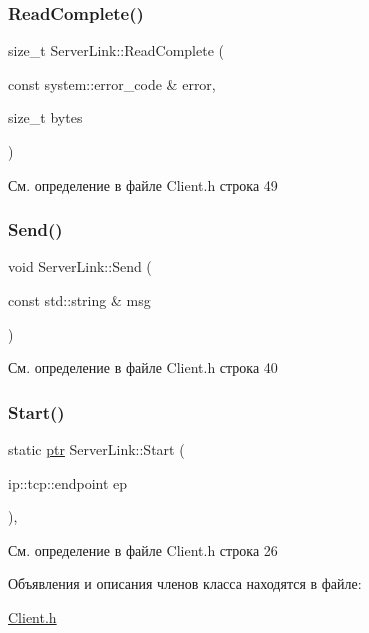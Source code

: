\subsubsection{\texorpdfstring{ReadComplete()}{ReadComplete()}}
{\footnotesize\ttfamily size\+\_\+t Server\+Link\+::\+Read\+Complete (\begin{DoxyParamCaption}\item[{const system\+::error\+\_\+code \&}]{error,  }\item[{size\+\_\+t}]{bytes }\end{DoxyParamCaption})\hspace{0.3cm}{\ttfamily [inline]}}



См. определение в файле Client.\+h строка 49

\mbox{\label{class_server_link_accf9e304c68111f1dbb1df82e2ae3ca5}} 
\subsubsection{\texorpdfstring{Send()}{Send()}}
{\footnotesize\ttfamily void Server\+Link\+::\+Send (\begin{DoxyParamCaption}\item[{const std\+::string \&}]{msg }\end{DoxyParamCaption})\hspace{0.3cm}{\ttfamily [inline]}}



См. определение в файле Client.\+h строка 40

\mbox{\label{class_server_link_a72edc7fb4b20cc9bd157863b2ee4b279}} 
\subsubsection{\texorpdfstring{Start()}{Start()}}
{\footnotesize\ttfamily static \mbox{\hyperlink{class_server_link_afb05b9f4060b17ac50d2fb3b874ce236}{ptr}} Server\+Link\+::\+Start (\begin{DoxyParamCaption}\item[{ip\+::tcp\+::endpoint}]{ep }\end{DoxyParamCaption})\hspace{0.3cm}{\ttfamily [inline]}, {\ttfamily [static]}}



См. определение в файле Client.\+h строка 26



Объявления и описания членов класса находятся в файле\+:\begin{DoxyCompactItemize}
\item 
\mbox{\hyperlink{_client_8h}{Client.\+h}}\end{DoxyCompactItemize}

